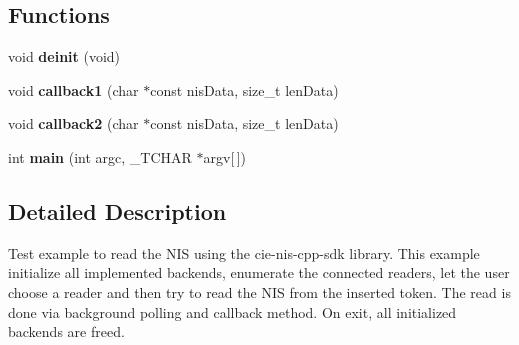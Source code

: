 \subsection*{Functions}
\begin{DoxyCompactItemize}
\item 
\hypertarget{example-nis_8cpp_a69ae4e4b8cbfc3c58977ec9c4daecc65}{void {\bfseries deinit} (void)}\label{example-nis_8cpp_a69ae4e4b8cbfc3c58977ec9c4daecc65}

\item 
\hypertarget{example-nis_8cpp_a3b076cc0c6862bee46c48542096e2b88}{void {\bfseries callback1} (char $\ast$const nis\-Data, size\-\_\-t len\-Data)}\label{example-nis_8cpp_a3b076cc0c6862bee46c48542096e2b88}

\item 
\hypertarget{example-nis_8cpp_a5dac98f4ee37401e6d46f794b258b151}{void {\bfseries callback2} (char $\ast$const nis\-Data, size\-\_\-t len\-Data)}\label{example-nis_8cpp_a5dac98f4ee37401e6d46f794b258b151}

\item 
\hypertarget{example-nis_8cpp_a9ef43c94a04d3145f5f315231da4526e}{int {\bfseries main} (int argc, \-\_\-\-T\-C\-H\-A\-R $\ast$argv\mbox{[}$\,$\mbox{]})}\label{example-nis_8cpp_a9ef43c94a04d3145f5f315231da4526e}

\end{DoxyCompactItemize}


\subsection{Detailed Description}
Test example to read the N\-I\-S using the cie-\/nis-\/cpp-\/sdk library. This example initialize all implemented backends, enumerate the connected readers, let the user choose a reader and then try to read the N\-I\-S from the inserted token. The read is done via background polling and callback method. On exit, all initialized backends are freed. 